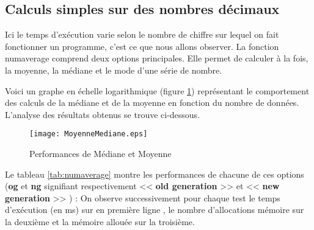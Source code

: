 \subsection{Calculs simples sur des nombres d\'ecimaux}

Ici le temps d'ex\'ecution varie selon le nombre de chiffre sur lequel on fait fonctionner un programme, c'est ce que nous allons observer.
La fonction numaverage comprend deux options principales. Elle permet de calculer \`a la fois, la moyenne, la m\'ediane et le mode d'une s\'erie de nombre.
\newline

Voici un graphe en \'echelle logarithmique (figure \ref{tab:medmoy}) repr\'esentant le comportement des calculs de la m\'ediane et de la moyenne en fonction du nombre de 
donn\'ees. L'analyse des r\'esultats obtenus se trouve ci-dessous.

\begin{figure}[h]
\begin{center}
\texttt{[image: MoyenneMediane.eps]}
\end{center}
\caption{Performances de M\'ediane et Moyenne}
\label{tab:medmoy}
\end{figure}

Le tableau \ref{tab:numaverage} montre les performances de chacune de ces options (\textbf{og} et \textbf{ng} signifiant respectivement << \textbf{old generation} >> et << \textbf{new generation} >> ) : 
\newline
On observe successivement pour chaque test le temps d'ex\'ecution (en ms) sur en premi\`ere ligne , le nombre d'allocations m\'emoire sur la deuxi\`eme et la m\'emoire
allou\'ee sur la troisi\`eme.
\newline

